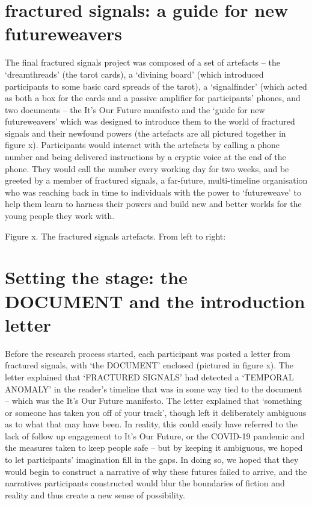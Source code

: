 \section{fractured signals: a guide for new futureweavers}

The final fractured signals project was composed of a set of artefacts – the ‘dreamthreads’ (the tarot cards), a ‘divining board’ (which introduced  participants to some basic card spreads of the tarot), a ‘signalfinder’ (which acted as both a box for the cards and a passive amplifier for participants’ phones, and two documents – the It’s Our Future manifesto and the ‘guide for new futureweavers’ which was designed to introduce them to the world of fractured signals and their newfound powers (the artefacts are all pictured together in figure x).   Participants would interact with the artefacts by calling a phone number and being delivered instructions by a cryptic voice at the end of the phone. They would call the number every working day for two weeks, and be greeted by a member of fractured signals, a far-future, multi-timeline organisation who was reaching back in time to individuals with the power to ‘futureweave’ to help them learn to harness their powers and build new and better worlds for the young people they work with. 

Figure x. The fractured signals artefacts. From left to right: 

\section{Setting the stage: the DOCUMENT and the introduction letter}

Before the research process started, each participant was posted a letter from fractured signals, with ‘the DOCUMENT’ enclosed (pictured in figure x). The letter explained that ‘FRACTURED SIGNALS’ had detected a ‘TEMPORAL ANOMALY’ in the reader’s timeline that was in some way tied to the document – which was the It’s Our Future manifesto. The letter explained that ‘something or someone has taken you off of your track’, though left it deliberately ambiguous as to what that may have been. In reality, this could easily have referred to the lack of follow up engagement to It’s Our Future, or the COVID-19 pandemic and the measures taken to keep people safe – but by keeping it ambiguous, we hoped to let participants’ imagination fill in the gaps. In doing so, we hoped that they would begin to construct a narrative of why these futures failed to arrive, and the narratives participants constructed would blur the boundaries of fiction and reality and thus create a new sense of possibility. 

